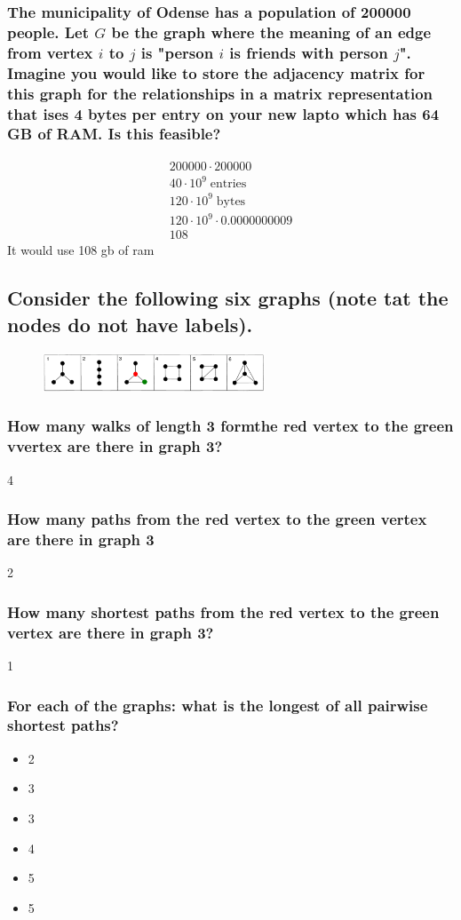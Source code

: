 \documentclass[12pt, a4paper]{article}
\begin{document}
		\subsubsection{The municipality of Odense has a population of 200000 people. Let $G$ be the graph where the meaning of an edge from vertex $i$ to $j$ is "person $i$ is friends with person $j$". Imagine you would like to store the adjacency matrix for this graph for the relationships in a matrix representation that ises 4 bytes per entry on your new lapto which has 64 GB of RAM. Is this feasible?}
			\begin{align*}
				200000\cdot 200000\\
				40\cdot 10^9\;\text{entries}\\
				120\cdot 10^9\;\text{bytes}\\
				120\cdot 10^9\cdot 0.0000000009\\
				108
			\end{align*}
			It would use 108 gb of ram
		\subsection{Consider the following six graphs (note tat the nodes do not have labels).}
			\begin{figure}[h!]
				\centering
				\includegraphics[width=250px]{images/49,5.png}
				\label{}
				\caption{}
			\end{figure}
			
			\subsubsection{How many walks of length 3 formthe red vertex to the green vvertex are there in graph 3?}
				4
			\subsubsection{How many paths from the red vertex to the green vertex are there in graph 3}
				2
			\subsubsection{How many shortest paths from the red vertex to the green vertex are there in graph 3?}
				1
			\subsubsection{For each of the graphs: what is the longest of all pairwise shortest paths?}
				\begin{itemize}
					\item 2
					\item 3
					\item 3
					\item 4
					\item 5
					\item 5
				\end{itemize}
\end{document}
